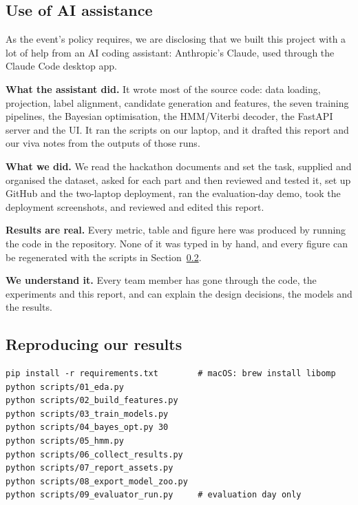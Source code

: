 \documentclass[11pt,a4paper]{article}
\begin{document}
\subsection{Use of AI assistance}
As the event's policy requires, we are disclosing that we built this project with a lot of help from an AI
coding assistant: Anthropic's Claude, used through the Claude Code desktop app.

\textbf{What the assistant did.} It wrote most of the source code: data loading, projection, label
alignment, candidate generation and features, the seven training pipelines, the Bayesian optimisation, the
HMM/Viterbi decoder, the FastAPI server and the UI. It ran the scripts on our laptop, and it drafted this
report and our viva notes from the outputs of those runs.

\textbf{What we did.} We read the hackathon documents and set the task, supplied and organised the dataset,
asked for each part and then reviewed and tested it, set up GitHub and the two-laptop deployment, ran the
evaluation-day demo, took the deployment screenshots, and reviewed and edited this report.

\textbf{Results are real.} Every metric, table and figure here was produced by running the code in the
repository. None of it was typed in by hand, and every figure can be regenerated with the scripts in
Section~\ref{sec:repro}.

\textbf{We understand it.} Every team member has gone through the code, the experiments and this report,
and can explain the design decisions, the models and the results.

\subsection{Reproducing our results}
\label{sec:repro}
\begin{verbatim}
pip install -r requirements.txt        # macOS: brew install libomp
python scripts/01_eda.py
python scripts/02_build_features.py
python scripts/03_train_models.py
python scripts/04_bayes_opt.py 30
python scripts/05_hmm.py
python scripts/06_collect_results.py
python scripts/07_report_assets.py
python scripts/08_export_model_zoo.py
python scripts/09_evaluator_run.py     # evaluation day only
\end{verbatim}
\end{document}

